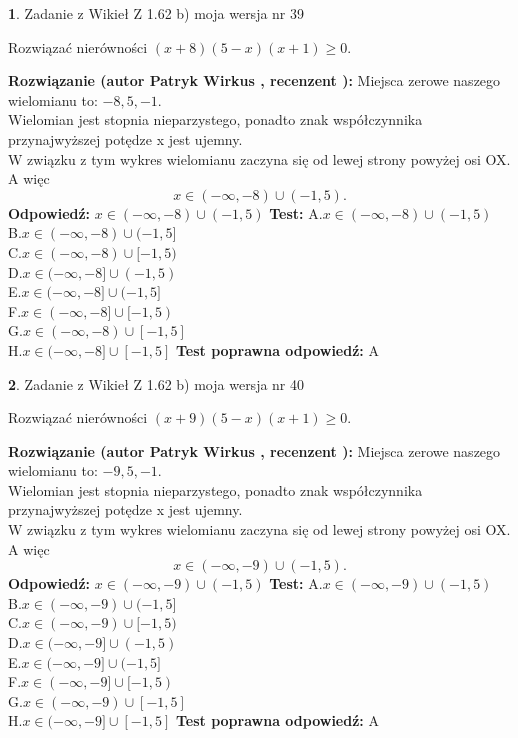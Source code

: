 \documentclass[12pt, a4paper]{article}
\theoremstyle{definition} %
\newtheorem{zad}{}
\newcommand{\zadStart}[1]{\begin{zad}#1\newline}
\newcommand{\zadStop}{\end{zad}}
\newcommand{\rozwStart}[2]{\noindent \textbf{Rozwiązanie (autor #1 , recenzent #2): }\newline}
\newcommand{\rozwStop}{\newline}
\newcommand{\odpStart}{\noindent \textbf{Odpowiedź:}\newline}
\newcommand{\odpStop}{\newline}
\newcommand{\testStart}{\noindent \textbf{Test:}\newline}
\newcommand{\testStop}{\newline}
\newcommand{\kluczStart}{\noindent \textbf{Test poprawna odpowiedź:}\newline}
\newcommand{\kluczStop}{\newline}
\begin{document}
\zadStart{Zadanie z Wikieł Z 1.62 b) moja wersja nr 39}

Rozwiązać nierówności $(x+8)(5-x)(x+1)\ge0$.
\zadStop
\rozwStart{Patryk Wirkus}{}
Miejsca zerowe naszego wielomianu to: $-8, 5, -1$.\\
Wielomian jest stopnia nieparzystego, ponadto znak współczynnika przy\linebreak najwyższej potędze x jest ujemny.\\ W związku z tym wykres wielomianu zaczyna się od lewej strony powyżej osi OX. A więc $$x \in (-\infty,-8) \cup (-1,5).$$
\rozwStop
\odpStart
$x \in (-\infty,-8) \cup (-1,5)$
\odpStop
\testStart
A.$x \in (-\infty,-8) \cup (-1,5)$\\
B.$x \in (-\infty,-8) \cup (-1,5]$\\
C.$x \in (-\infty,-8) \cup [-1,5)$\\
D.$x \in (-\infty,-8] \cup (-1,5)$\\
E.$x \in (-\infty,-8] \cup (-1,5]$\\
F.$x \in (-\infty,-8] \cup [-1,5)$\\
G.$x \in (-\infty,-8) \cup [-1,5]$\\
H.$x \in (-\infty,-8] \cup [-1,5]$
\testStop
\kluczStart
A
\kluczStop



\zadStart{Zadanie z Wikieł Z 1.62 b) moja wersja nr 40}

Rozwiązać nierówności $(x+9)(5-x)(x+1)\ge0$.
\zadStop
\rozwStart{Patryk Wirkus}{}
Miejsca zerowe naszego wielomianu to: $-9, 5, -1$.\\
Wielomian jest stopnia nieparzystego, ponadto znak współczynnika przy\linebreak najwyższej potędze x jest ujemny.\\ W związku z tym wykres wielomianu zaczyna się od lewej strony powyżej osi OX. A więc $$x \in (-\infty,-9) \cup (-1,5).$$
\rozwStop
\odpStart
$x \in (-\infty,-9) \cup (-1,5)$
\odpStop
\testStart
A.$x \in (-\infty,-9) \cup (-1,5)$\\
B.$x \in (-\infty,-9) \cup (-1,5]$\\
C.$x \in (-\infty,-9) \cup [-1,5)$\\
D.$x \in (-\infty,-9] \cup (-1,5)$\\
E.$x \in (-\infty,-9] \cup (-1,5]$\\
F.$x \in (-\infty,-9] \cup [-1,5)$\\
G.$x \in (-\infty,-9) \cup [-1,5]$\\
H.$x \in (-\infty,-9] \cup [-1,5]$
\testStop
\kluczStart
A
\kluczStop
\end{document}
